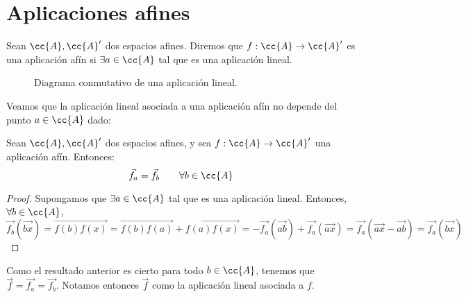 \section{Aplicaciones afines}
\begin{definicion}
    Sean $\cc{A}, \cc{A}'$ dos espacios afines. Diremos que $f:\cc{A}\to \cc{A}'$ es una aplicación afín si $\exists a\in \cc{A}$ tal que
    es una aplicación lineal.
\end{definicion}

\begin{figure}[H]
    \centering
    \caption{Diagrama conmutativo de una aplicación lineal.}
    \label{fig:cd:ApLineal_Basico}
\end{figure}

Veamos que la aplicación lineal asociada a una aplicación afín no depende del punto $a\in \cc{A}$ dado:
\begin{lema}
    Sean $\cc{A}, \cc{A}'$ dos espacios afines, y sea $f:\cc{A}\to \cc{A}'$ una aplicación afín. Entonces:
    \begin{equation*}
        \vec{f_a} = \vec{f_b} \qquad \forall b\in \cc{A}
    \end{equation*}
\end{lema}
\begin{proof}
    Supongamos que $\exists a\in \cc{A}$ tal que
    es una aplicación lineal. Entonces, $\forall b\in \cc{A}$,
    \begin{equation*}
        \vec{f_b}(\vec{bx}) = \vec{f(b)f(x)} = \vec{f(b)f(a)} + \vec{f(a)f(x)} = -\vec{f_a}(\vec{ab}) + \vec{f_a}(\vec{ax})
        = \vec{f_a}(\vec{ax}-\vec{ab}) = \vec{f_a}(\vec{bx})
    \end{equation*}
\end{proof}

Como el resultado anterior es cierto para todo $b\in \cc{A}$, tenemos que $\vec{f}=\vec{f_a} = \vec{f_b}$. Notamos entonces $\vec{f}$ como la aplicación lineal asociada a $f$.

